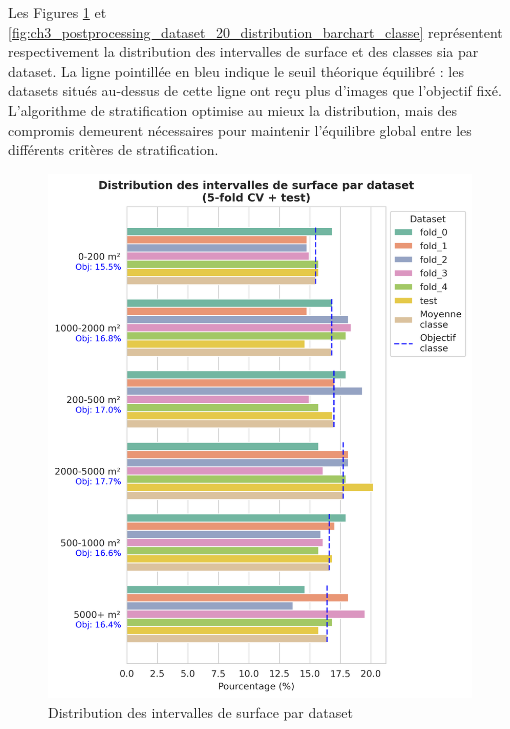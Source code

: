 Les Figures \ref{fig:ch3_postprocessing_dataset_19_distribution_barchart_surface} et \ref{fig:ch3_postprocessing_dataset_20_distribution_barchart_classe} représentent respectivement la distribution des intervalles de surface et des classes \gls{sia} par dataset. La ligne pointillée en bleu indique le seuil théorique équilibré : les datasets situés au-dessus de cette ligne ont reçu plus d'images que l'objectif fixé. L'algorithme de stratification optimise au mieux la distribution, mais des compromis demeurent nécessaires pour maintenir l'équilibre global entre les différents critères de stratification.

\begin{figure}[H]
    \centering
    \includegraphics[width=1\linewidth]{02-main/figures/ch3/ch3_postprocessing_dataset_19_distribution_barchart_surface.png}
    \caption{Distribution des intervalles de surface par dataset}
    \label{fig:ch3_postprocessing_dataset_19_distribution_barchart_surface}
\end{figure}

